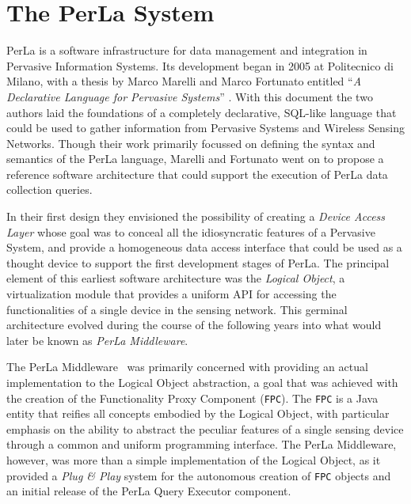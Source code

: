 \chapter{The PerLa System}

PerLa is a software infrastructure for data management and integration in
Pervasive Information Systems. Its development began in 2005 at Politecnico di
Milano, with a thesis by Marco Marelli and Marco Fortunato entitled ``\textit{A
Declarative Language for Pervasive Systems}'' \cite{mm_thesis}. With this
document the two authors laid the foundations of a completely declarative,
SQL-like language that could be used to gather information from Pervasive
Systems and Wireless Sensing Networks. Though their work primarily focussed on
defining the syntax and semantics of the PerLa language, Marelli and Fortunato
went on to propose a reference software architecture that could support the
execution of PerLa data collection queries.

In their first design they envisioned the possibility of creating a
\textit{Device Access Layer} whose goal was to conceal all the idiosyncratic
features of a Pervasive System, and provide a homogeneous data access interface
that could be used as a thought device to support the first development stages
of PerLa. The principal element of this earliest software architecture was the
\textit{Logical Object}, a virtualization module that provides a uniform API
for accessing the functionalities of a single device in the sensing network.
This germinal architecture evolved during the course of the following years
into what would later be known as \textit{PerLa Middleware}. 

The PerLa Middleware~\cite{tse_perla} was primarily concerned with providing an
actual implementation to the Logical Object abstraction, a goal that was
achieved with the creation of the Functionality Proxy Component (\texttt{FPC}).
The \texttt{FPC} is a Java entity that reifies all concepts embodied by the
Logical Object, with particular emphasis on the ability to abstract the
peculiar features of a single sensing device through a common and uniform
programming interface. The PerLa Middleware, however, was more than a simple
implementation of the Logical Object, as it provided a \textit{Plug \& Play}
system for the autonomous creation of \texttt{FPC} objects and an initial
release of the PerLa Query Executor component.

